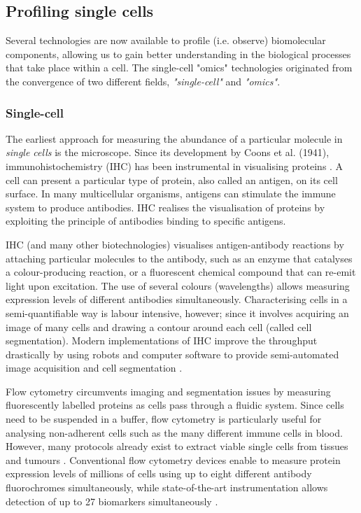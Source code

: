 
\subsection{Profiling single cells}
Several technologies are now available to profile (i.e. observe) biomolecular components, allowing us to gain better understanding in the biological processes that take place within a cell. The single-cell "omics" technologies originated from the convergence of two different fields, \emph{"single-cell"} and \emph{"omics"}.

\subsubsection{Single-cell}
The earliest approach for measuring the abundance of a particular molecule in \emph{single cells} is the microscope.
Since its development by Coons et al. (1941), immunohistochemistry (IHC) has been instrumental in visualising proteins \cite{coons_immunologicalpropertiesantibody_1941}. 
A cell can present a particular type of protein, also called an antigen, on its cell surface. In many multicellular organisms, antigens can stimulate the immune system to produce antibodies. IHC realises the visualisation of proteins by exploiting the principle of antibodies binding to specific antigens.

IHC (and many other biotechnologies) visualises antigen-antibody reactions by attaching particular molecules to the antibody, such as an enzyme that catalyses a colour-producing reaction, or a fluorescent chemical compound that can re-emit light upon excitation. The use of several colours (wavelengths) allows measuring expression levels of different antibodies simultaneously. Characterising cells in a semi-quantifiable way is labour intensive, however; since it involves acquiring an image of many cells and drawing a contour around each cell (called cell segmentation).
Modern implementations of IHC improve the throughput drastically by using robots and computer software to provide semi-automated image acquisition and cell segmentation \cite{theodosiou_automatedanalysisfish_2007}.

Flow cytometry \cite{fulwyler_electronicseparationbiological_1965} circumvents imaging and segmentation issues by measuring fluorescently labelled proteins as cells pass through a fluidic system.
Since cells need to be suspended in a buffer, flow cytometry is particularly useful for analysing non-adherent cells such as the many different immune cells in blood. However, many protocols already exist to extract viable single cells from tissues and tumours \cite{leelatian_preparingviablesingle_2017}.
Conventional flow cytometry devices enable to measure protein expression levels of millions of cells using up to eight different antibody fluorochromes simultaneously, while state-of-the-art instrumentation allows detection of up to 27 biomarkers simultaneously \cite{cossarizza_guidelinesuseflow_2017}.

